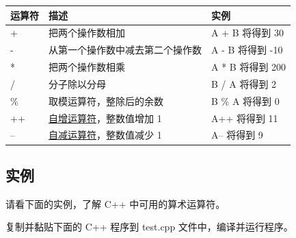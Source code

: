 \documentclass[
]{article}
\begin{document}
\begin{longtable}[]{@{}lll@{}}
\toprule
运算符 & 描述 & 实例 \\
\midrule
\endhead
+ & 把两个操作数相加 & A + B 将得到 30 \\
- & 从第一个操作数中减去第二个操作数 & A - B 将得到 -10 \\
* & 把两个操作数相乘 & A * B 将得到 200 \\
/ & 分子除以分母 & B / A 将得到 2 \\
\% & 取模运算符，整除后的余数 & B \% A 将得到 0 \\
++ &
\href{https://edu.aliyun.com/cplusplus/cpp-increment-decrement-operators.html}{自增运算符}，整数值增加
1 & A++ 将得到 11 \\
-- &
\href{https://edu.aliyun.com/cplusplus/cpp-increment-decrement-operators.html}{自减运算符}，整数值减少
1 & A-- 将得到 9 \\
\bottomrule
\end{longtable}

\hypertarget{ux5b9eux4f8b-5}{%
\subsection{实例}\label{ux5b9eux4f8b-5}}

请看下面的实例，了解 C++ 中可用的算术运算符。

复制并黏贴下面的 C++ 程序到 test.cpp 文件中，编译并运行程序。
\end{document}
